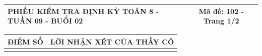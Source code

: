 \documentclass[12pt,a4paper]{article}
\begin{document}
\newpage
\noindent
\begin{tabularx}{\linewidth}{|X|c|}
\hline
\textbf{PHIẾU KIỂM TRA ĐỊNH KỲ TOÁN 8 - TUẦN 09 - BUỔI 02} & \textbf{Mã đề: 102 - Trang 1/2} \\
\hline
\end{tabularx}

\vspace{1.2mm}

\noindent
\begin{tabularx}{\linewidth}{|p{3.2cm}|X|}
\hline
\centering\textbf{ĐIỂM SỐ} & \centering\textbf{LỜI NHẬN XÉT CỦA THẦY CÔ} \tabularnewline
\hline
\rule{0pt}{1.8cm} & \tabularnewline
\hline
\end{tabularx}
\end{document}
